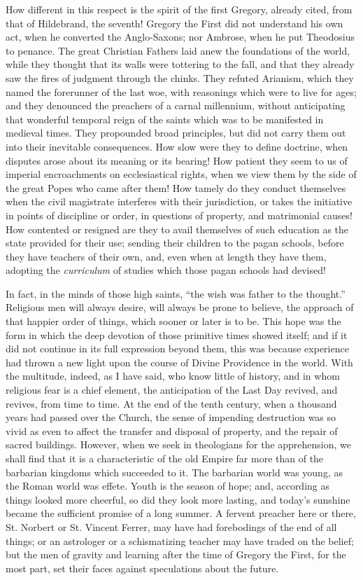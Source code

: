 How different in this respect is the spirit of the first Gregory,
already cited, from that of Hildebrand, the seventh! Gregory the First
did not understand his own act, when he converted the Anglo-Saxons;
nor Ambrose, when he put Theodosius to penance. The great Christian
Fathers laid anew the foundations of the world, while they thought
that its walls were tottering to the fall, and that they already saw
the fires of judgment through the chinks. They refuted Arianism, which
they named the forerunner of the last woe, with reasonings which were
to live for ages; and they denounced the preachers of a carnal
millennium, without anticipating that wonderful temporal reign of the
saints which was to be manifested in medieval times. They propounded
broad principles, but did not carry them out into their inevitable
consequences. How slow were they to define doctrine, when disputes
arose about its meaning or its bearing! How patient they seem to us of
imperial encroachments on ecclesiastical rights, when we view them by
the side of the great Popes who came after them! How tamely do they
conduct themselves when the civil magistrate interferes with their
jurisdiction, or takes the initiative in points of discipline or
order, in questions of property, and matrimonial causes! How contented
or resigned are they to avail themselves of such education as the
state provided for their use; sending their children to the pagan
schools, before they have teachers of their own, and, even when at
length they have them, adopting the \emph{curriculum} of studies
which those pagan schools had devised!

In fact, in the minds of those high saints, ``the wish was
father to the thought.'' Religious men will always desire, will
always be prone to believe, the approach of that happier order of
things, which sooner or later is to be. This hope was the form in
which the deep devotion of those primitive times showed itself; and if
it did not continue in its full expression beyond them, this was
because experience had thrown a new light upon the course of Divine
Providence in the world. With the multitude, indeed, as I have said,
who know little of history, and in whom religious fear is a chief
element, the anticipation of the Last Day revived, and revives, from
time to time. At the end of the tenth century, when a thousand years
had passed over the Church, the sense of impending destruction was so
vivid as even to affect the transfer and disposal of property, and the
repair of sacred buildings. However, when we seek in theologians for
the apprehension, we shall find that it is a characteristic of the old
Empire far more than of the barbarian kingdoms which succeeded to it.
The barbarian world was young, as the Roman world was effete. Youth is
the season of hope; and, according as things looked more cheerful, so
did they look more lasting, and today's sunshine became the sufficient
promise of a long summer. A fervent preacher here or there, St.
Norbert or St. Vincent Ferrer, may have had forebodings of the end of
all things; or an astrologer or a schismatizing teacher may have
traded on the belief; but the men of gravity and learning after the
time of Gregory the First, for the most part, set their faces against
speculations about the future.

